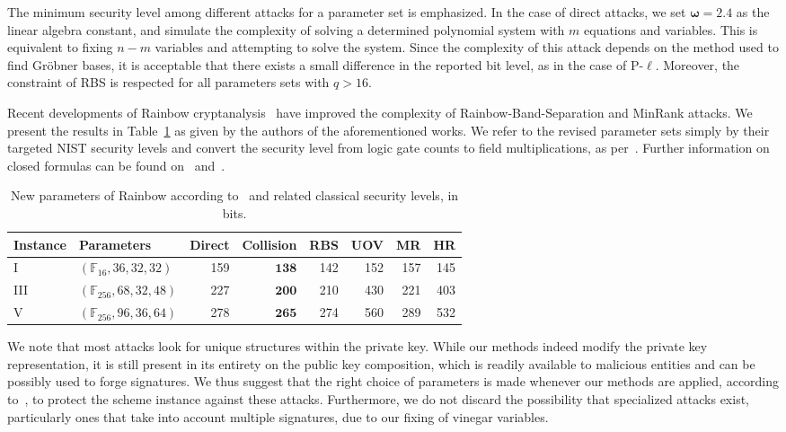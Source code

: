\documentclass[12pt, a4paper, oneside]{memoir}
\theoremstyle{definition}
\begin{document}
The minimum security level among different attacks for a parameter set is emphasized. In the case of direct attacks, we set $\bm{\omega} = 2.4$ as the linear algebra constant, and simulate the complexity of solving a determined polynomial system with $m$ equations and variables. This is equivalent to fixing $n - m$ variables and attempting to solve the system. Since the complexity of this attack depends on the method used to find Gröbner bases, it is acceptable that there exists a small difference in the reported bit level, as in the case of P-$\ell$. Moreover, the constraint of RBS is respected for all parameters sets with $q > 16$. 

Recent developments of Rainbow cryptanalysis~\cite{Ding:202006} have improved the complexity of Rainbow-Band-Separation and MinRank attacks. We present the results in Table~\ref{tab:newsec} as given by the authors of the aforementioned works. We refer to the revised parameter sets simply by their targeted NIST security levels and convert the security level from logic gate counts to field multiplications, as per~\cite[p.~35]{Ding:201901}. Further information on closed formulas can be found on~\cite[Eq.~19]{Nakamura:202006} and~\cite[Sec.~5]{Nakamura:202007}.

\begin{table}[htbp]
  \centering
  \renewcommand{\arraystretch}{1.2}
  \caption{New parameters of Rainbow according to~\cite[Sec.~4]{Ding:202006} and related classical security levels, in bits.}\label{tab:newsec}
  \begin{tabular}{*{2}{l}*{6}{r}}
    \toprule
    Instance & Parameters & Direct & Collision & RBS & UOV & MR & HR \\
    \midrule
    I    & $(\mathbb{F}_{ 16}, 36, 32, 32)$  &              159 &  $\mathbf{ 138}$ &              142 &              152 &              157 &              145 \\
    III  & $(\mathbb{F}_{256}, 68, 32, 48)$  &              227 &  $\mathbf{ 200}$ &              210 &              430 &              221 &              403 \\
    V    & $(\mathbb{F}_{256}, 96, 36, 64)$  &              278 &  $\mathbf{ 265}$ &              274 &              560 &              289 &              532 \\
    \bottomrule
  \end{tabular}
\end{table}

We note that most attacks look for unique structures within the private key. While our methods indeed modify the private key representation, it is still present in its entirety on the public key composition, which is readily available to malicious entities and can be possibly used to forge signatures. We thus suggest that the right choice of parameters is made whenever our methods are applied, according to~\cite{Petzoldt:201005}, to protect the scheme instance against these attacks. Furthermore, we do not discard the possibility that specialized attacks exist, particularly ones that take into account multiple signatures, due to our fixing of vinegar variables. 
\end{document}
